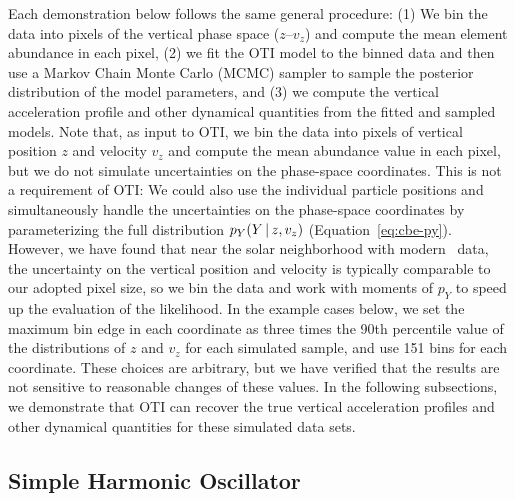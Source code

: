 \documentclass[modern]{aastex631}
\begin{document}
Each demonstration below follows the same general procedure: (1) We bin the data into
pixels of the vertical phase space ($z$--$v_z$) and compute the mean element abundance
in each pixel, (2) we fit the OTI model to the binned data and then use a Markov Chain
Monte Carlo (MCMC) sampler to sample the posterior distribution of the model parameters,
and (3) we compute the vertical acceleration profile and other dynamical quantities from
the fitted and sampled models.
Note that, as input to OTI, we bin the data into pixels of vertical position $z$ and
velocity $v_z$ and compute the mean abundance value in each pixel, but we do not
simulate uncertainties on the phase-space coordinates.
This is not a requirement of OTI: We could also use the individual particle positions
and simultaneously handle the uncertainties on the phase-space coordinates by
parameterizing the full distribution $p_Y(Y \,|\, z, v_z)$ (Equation~\ref{eq:cbe-py}).
However, we have found that near the solar neighborhood with modern \gaia\ data, the
uncertainty on the vertical position and velocity is typically comparable to our adopted
pixel size, so we bin the data and work with moments of $p_Y$ to speed up the evaluation
of the likelihood.
In the example cases below, we set the maximum bin edge in each coordinate as three
times the 90th percentile value of the distributions of $z$ and $v_z$ for each simulated
sample, and use 151 bins for each coordinate.
These choices are arbitrary, but we have verified that the results are not sensitive to
reasonable changes of these values.
In the following subsections, we demonstrate that OTI can recover the true vertical
acceleration profiles and other dynamical quantities for these simulated data sets.


\subsection{Simple Harmonic Oscillator}
\label{sec:sim-sho}
\end{document}
